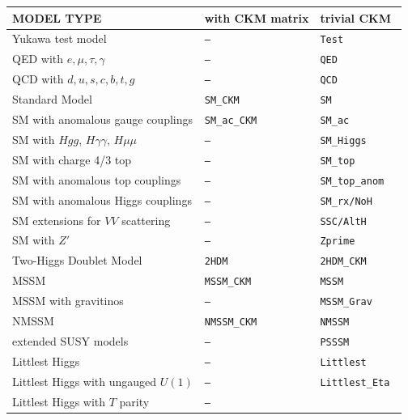 \documentclass[12pt]{book}
\begin{document}
\begin{table}
        \begin{center}
           \begin{tabular}{|l|l|l|}
             \hline
             MODEL TYPE & with CKM matrix & trivial CKM \\
             \hline\hline
             Yukawa test model & \tt{---} & \tt{Test} \\
             \hline
             QED with $e,\mu,\tau,\gamma$ & \tt{---} &  \tt{QED} \\
             QCD with $d,u,s,c,b,t,g$ & \tt{---} &  \tt{QCD} \\
             Standard Model        & \tt{SM\_CKM} & \tt{SM} \\
             SM with anomalous gauge couplings &  \tt{SM\_ac\_CKM} &
             \tt{SM\_ac} \\
             SM with $Hgg$, $H\gamma\gamma$, $H\mu\mu$ &  \tt{---} &
             \tt{SM\_Higgs} \\
             SM with charge 4/3 top &  \tt{---} &
             \tt{SM\_top} \\
             SM with anomalous top couplings &  \tt{---} &
             \tt{SM\_top\_anom} \\
             SM with anomalous Higgs couplings &  \tt{---} &
             \tt{SM\_rx}/\tt{NoH} \\\hline
             SM extensions for $VV$ scattering & \tt{---} &
             \tt{SSC}/\tt{AltH} \\\hline
             SM with $Z'$ & \tt{---} & \tt{Zprime} \\
             \hline
             Two-Higgs Doublet Model & \tt{2HDM} & \tt{2HDM\_CKM} \\ \hline\hline
             MSSM &   \tt{MSSM\_CKM} & \tt{MSSM} \\
             \hline
             MSSM with gravitinos &   \tt{---} & \tt{MSSM\_Grav} \\
             \hline
             NMSSM &   \tt{NMSSM\_CKM} & \tt{NMSSM} \\
             \hline
             extended SUSY models &   \tt{---} & \tt{PSSSM} \\
             \hline\hline
             Littlest Higgs &  \tt{---} & \tt{Littlest} \\
             \hline
             Littlest Higgs with ungauged $U(1)$ &  \tt{---} &
             \tt{Littlest\_Eta} \\
             \hline
             Littlest Higgs with $T$ parity &  \tt{---} &

\end{tabular}
\end{center}
\end{table}
\end{document}
